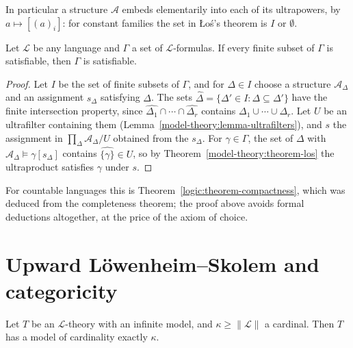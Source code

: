 In particular a structure $\mathcal{A}$ embeds elementarily into each of its ultrapowers, by $a \mapsto [(a)_i]$: for constant families the set in Łoś's
theorem is $I$ or $\emptyset$.

\begin{theorem}\label{model-theory:theorem-compactness}
Let $\mathcal{L}$ be any language and $\Gamma$ a set of $\mathcal{L}$-formulas. If every finite subset of $\Gamma$ is satisfiable, then $\Gamma$ is satisfiable.
\end{theorem}

\begin{proof}
Let $I$ be the set of finite subsets of $\Gamma$, and for $\Delta \in I$ choose a structure $\mathcal{A}_\Delta$ and an assignment $s_\Delta$ satisfying $\Delta$.
The sets $\widehat{\Delta} = \{\Delta' \in I : \Delta \subseteq \Delta'\}$ have the finite intersection property, since
$\widehat{\Delta_1} \cap \cdots \cap \widehat{\Delta_r}$ contains $\Delta_1 \cup \cdots \cup \Delta_r$. Let $U$ be an ultrafilter containing them
(Lemma~\ref{model-theory:lemma-ultrafilters}), and $s$ the assignment in $\prod_\Delta\mathcal{A}_\Delta/U$ obtained from the $s_\Delta$. For $\gamma \in \Gamma$,
the set of $\Delta$ with $\mathcal{A}_\Delta \models \gamma[s_\Delta]$ contains $\widehat{\{\gamma\}} \in U$, so by Theorem~\ref{model-theory:theorem-los} the ultraproduct
satisfies $\gamma$ under $s$.
\end{proof}

For countable languages this is Theorem~\ref{logic:theorem-compactness}, which was deduced from the completeness theorem; the proof above avoids formal
deductions altogether, at the price of the axiom of choice.

\section{Upward L\"owenheim--Skolem and categoricity}\label{model-theory:section-categoricity}

\begin{theorem}\label{model-theory:theorem-upward-lowenheim-skolem}
Let $T$ be an $\mathcal{L}$-theory with an infinite model, and $\kappa \geq \|\mathcal{L}\|$ a cardinal. Then $T$ has a model of cardinality exactly $\kappa$.
\end{theorem}

